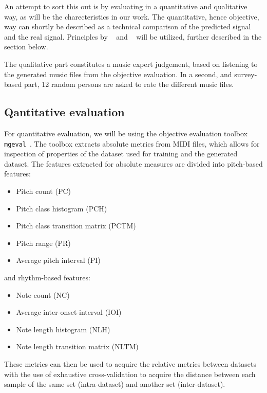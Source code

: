 \documentclass{IEEEtran}
\begin{document}
An attempt to sort this out is by evaluating in a quantitative and
qualitative way, as will be the charecteristics in our work. 
The quantitative, hence objective, way can shortly be
described as a technical comparison of the predicted signal and the real
signal. Principles by \citeauthor{yang2020evaluation}~\cite{yang2020evaluation}
and \citeauthor{wu2020jazz}~\cite{wu2020jazz} will be utilized, further described 
in the section below.

The qualitative part constitutes a music expert judgement, based on listening
to the generated music files from the objective evaluation. In a second, and
survey-based part, 12 random persons are asked to rate the different
music files.

\subsection{Qantitative evaluation}

For quantitative evaluation, we will be using the objective evaluation
toolbox \lstinline|mgeval|~\cite{yang2020evaluation}.
The toolbox extracts absolute
metrics from MIDI files, which allows for inspection of properties of the
dataset used for training and the generated dataset. The features extracted
for absolute measures are divided into pitch-based features:
\begin{itemize}
    \item Pitch count (PC)
    \item Pitch class histogram (PCH)
    \item Pitch class transition matrix (PCTM)
    \item Pitch range (PR)
    \item Average pitch interval (PI)
\end{itemize}

and rhythm-based features:

\begin{itemize}
    \item Note count (NC)
    \item Average inter-onset-interval (IOI)
    \item Note length histogram (NLH)
    \item Note length transition matrix (NLTM)
\end{itemize}

These metrics can then be used to
acquire the relative metrics between datasets with the use of exhaustive
cross-validation to acquire the distance between each sample of the same set
(intra-dataset) and another set (inter-dataset).
\end{document}
